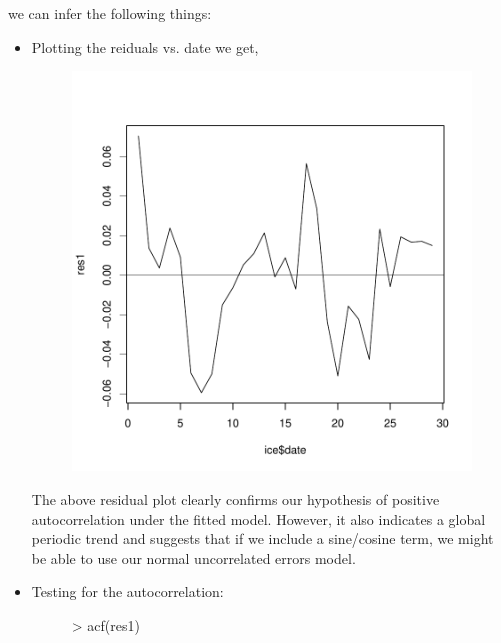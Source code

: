 \documentclass[12pt]{article}
\begin{document}
\begin{itemize}
we can infer the following things:
\begin{itemize}
\clearpage
\item Plotting the reiduals vs. date we get,
\begin{figure}[H]
\includegraphics{HW7-003}
\end{figure}
The above residual plot clearly confirms our hypothesis of positive autocorrelation under the fitted model. However, it also indicates a global periodic trend and suggests that if we include a sine/cosine term, we might be able to use our normal uncorrelated errors model.\\
\clearpage
\item Testing for the autocorrelation:
\begin{figure}[H]
\begin{Schunk}
\begin{Sinput}
> acf(res1)
\end{Sinput}
\end{Schunk}

\end{figure}
\end{itemize}
\end{itemize}
\end{document}
